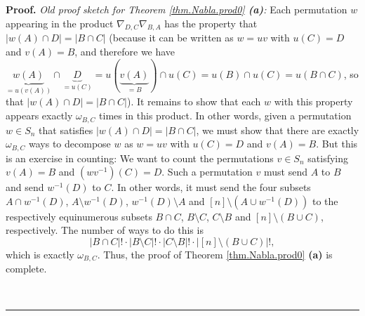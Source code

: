 \documentclass[numbers=enddot,12pt,final,onecolumn,notitlepage]{scrartcl}%
\newcounter{exer}
\numberwithin{exer}{subsection}
\theoremstyle{definition}
\newenvironment{proof}[1][Proof]{\noindent\textbf{#1.} }{\ \rule{0.5em}{0.5em}}
\newenvironment{noncompile}{}{}
\begin{document}
\begin{proof}
\begin{noncompile}
\textit{Old proof sketch for Theorem \ref{thm.Nabla.prod0} \textbf{(a)}:} Each
permutation $w$ appearing in the product $\nabla_{D,C}\nabla_{B,A}$ has the
property that $\left\vert w\left(  A\right)  \cap D\right\vert =\left\vert
B\cap C\right\vert $ (because it can be written as $w=uv$ with $u\left(
C\right)  =D$ and $v\left(  A\right)  =B$, and therefore we have
$\underbrace{w\left(  A\right)  }_{=u\left(  v\left(  A\right)  \right)  }%
\cap\underbrace{D}_{=u\left(  C\right)  }=u\left(  \underbrace{v\left(
A\right)  }_{=B}\right)  \cap u\left(  C\right)  =u\left(  B\right)  \cap
u\left(  C\right)  =u\left(  B\cap C\right)  $, so that $\left\vert w\left(
A\right)  \cap D\right\vert =\left\vert B\cap C\right\vert $). It remains to
show that each $w$ with this property appears exactly $\omega_{B,C}$ times in
this product. In other words, given a permutation $w\in S_{n}$ that satisfies
$\left\vert w\left(  A\right)  \cap D\right\vert =\left\vert B\cap
C\right\vert $, we must show that there are exactly $\omega_{B,C}$ ways to
decompose $w$ as $w=uv$ with $u\left(  C\right)  =D$ and $v\left(  A\right)
=B$. But this is an exercise in counting: We want to count the permutations
$v\in S_{n}$ satisfying $v\left(  A\right)  =B$ and $\left(  wv^{-1}\right)
\left(  C\right)  =D$. Such a permutation $v$ must send $A$ to $B$ and send
$w^{-1}\left(  D\right)  $ to $C$. In other words, it must send the four
subsets $A\cap w^{-1}\left(  D\right)  $, $A\setminus w^{-1}\left(  D\right)
$, $w^{-1}\left(  D\right)  \setminus A$ and $\left[  n\right]  \setminus
\left(  A\cup w^{-1}\left(  D\right)  \right)  $ to the respectively
equinumerous subsets $B\cap C$, $B\setminus C$, $C\setminus B$ and $\left[
n\right]  \setminus\left(  B\cup C\right)  $, respectively. The number of ways
to do this is
\[
\left\vert B\cap C\right\vert !\cdot\left\vert B\setminus C\right\vert
!\cdot\left\vert C\setminus B\right\vert !\cdot\left\vert \left[  n\right]
\setminus\left(  B\cup C\right)  \right\vert !,
\]
which is exactly $\omega_{B,C}$. Thus, the proof of Theorem
\ref{thm.Nabla.prod0} \textbf{(a)} is complete.
\end{noncompile}


\end{proof}
\end{document}

